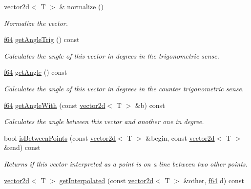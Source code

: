 \begin{DoxyCompactItemize}
\hyperlink{classirr_1_1core_1_1vector2d}{vector2d}$<$ T $>$ \& \hyperlink{classirr_1_1core_1_1vector2d_a5d5c360ed4c4fd28d4a42272634b8e55}{normalize} ()
\begin{DoxyCompactList}\small\item\em Normalize the vector. \end{DoxyCompactList}\item 
\hyperlink{namespaceirr_a1325b02603ad449f92c68fc640af9b28}{f64} \hyperlink{classirr_1_1core_1_1vector2d_af1baa5b3cf7484262fd32cfbe6698655}{get\+Angle\+Trig} () const 
\begin{DoxyCompactList}\small\item\em Calculates the angle of this vector in degrees in the trigonometric sense. \end{DoxyCompactList}\item 
\hyperlink{namespaceirr_a1325b02603ad449f92c68fc640af9b28}{f64} \hyperlink{classirr_1_1core_1_1vector2d_ab75f18492cd0dac6dd0936e1ac65dc86}{get\+Angle} () const 
\begin{DoxyCompactList}\small\item\em Calculates the angle of this vector in degrees in the counter trigonometric sense. \end{DoxyCompactList}\item 
\hyperlink{namespaceirr_a1325b02603ad449f92c68fc640af9b28}{f64} \hyperlink{classirr_1_1core_1_1vector2d_a581ab3975900d5af8d4c7517738beba2}{get\+Angle\+With} (const \hyperlink{classirr_1_1core_1_1vector2d}{vector2d}$<$ T $>$ \&b) const 
\begin{DoxyCompactList}\small\item\em Calculates the angle between this vector and another one in degree. \end{DoxyCompactList}\item 
bool \hyperlink{classirr_1_1core_1_1vector2d_adc8bba9dfd48218d083dcbe88bf98da0}{is\+Between\+Points} (const \hyperlink{classirr_1_1core_1_1vector2d}{vector2d}$<$ T $>$ \&begin, const \hyperlink{classirr_1_1core_1_1vector2d}{vector2d}$<$ T $>$ \&end) const 
\begin{DoxyCompactList}\small\item\em Returns if this vector interpreted as a point is on a line between two other points. \end{DoxyCompactList}\item 
\hyperlink{classirr_1_1core_1_1vector2d}{vector2d}$<$ T $>$ \hyperlink{classirr_1_1core_1_1vector2d_a865bbbdb5d5a7408cdf733d573c8d747}{get\+Interpolated} (const \hyperlink{classirr_1_1core_1_1vector2d}{vector2d}$<$ T $>$ \&other, \hyperlink{namespaceirr_a1325b02603ad449f92c68fc640af9b28}{f64} d) const 

\end{DoxyCompactItemize}
